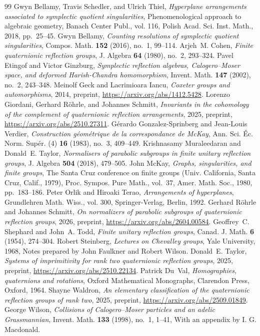 \documentclass[10pt,a4paper]{amsart}
\begin{document}
\begin{thebibliography}{99}
 Gwyn Bellamy, Travis Schedler, and Ulrich Thiel, \emph{Hyperplane arrangements associated to symplectic quotient singularities}, Phenomenological approach to algebraic geometry, Banach Center Publ., vol. 116, Polish Acad. Sci. Inst. Math., 2018, pp.~25--45.
 Gwyn Bellamy, \emph{Counting resolutions of symplectic quotient singularities}, Compos. Math. \textbf{152} (2016), no.~1, 99--114.
 Arjeh~M. Cohen, \emph{Finite quaternionic reflection groups}, J. Algebra \textbf{64} (1980), no.~2, 293--324.
 Pavel Etingof and Victor Ginzburg, \emph{Symplectic reflection algebras, {C}a\-lo\-ge\-ro--{M}oser space, and deformed {H}arish-{C}handra homomorphism}, Invent. Math. \textbf{147} (2002), no.~2, 243--348.
 Meinolf Geck and Lacrimioara Iancu, \emph{Coxeter groups and automorphisms}, 2014, preprint, \url{https://arxiv.org/abs/1412.5428}.
 Lorenzo Giordani, Gerhard Röhrle, and Johannes Schmitt, \emph{Invariants in the cohomology of the complement of quaternionic reflection arrangements}, 2025, preprint, \url{https://arxiv.org/abs/2510.27311}.
 Gérardo Gonzalez-Sprinberg and Jean-Louis Verdier, \emph{Con\-struc\-tion géo\-mé\-trique de la corres\-pon\-dance de {M}c{K}ay}, Ann. Sci. Éc. Norm. Supér. (4) \textbf{16} (1983), no.~3, 409--449.
 Krishnasamy Muraleedaran and Donald~E. Taylor, \emph{Normalisers of parabolic subgroups in finite unitary reflection groups}, J. Algebra \textbf{504} (2018), 479--505.
 John McKay, \emph{Graphs, singularities, and finite groups}, The {S}anta {C}ruz conference on finite groups ({U}niv. {C}alifornia, {S}anta {C}ruz, {C}alif., 1979), Proc. Sympos. Pure Math., vol.~37, Amer. Math. Soc., 1980, pp.~183--186.
 Peter Orlik and Hiroaki Terao, \emph{Arrangements of hyperplanes}, Grundlehren Math. Wiss., vol. 300, Springer-Verlag, Berlin, 1992.
 Gerhard Röhrle and Johannes Schmitt, \emph{On normalizers of parabolic subgroups of quaternionic reflection groups}, 2026, preprint, \url{https://arxiv.org/abs/2604.00584}.
 Geoffrey~C. Shephard and John~A. Todd, \emph{Finite unitary reflection groups}, Canad. J. Math. \textbf{6} (1954), 274--304.
 Robert Steinberg, \emph{Lectures on {C}hevalley groups}, Yale University, 1968, Notes prepared by John Faulkner and Robert Wilson.
 Donald~E. Taylor, \emph{Systems of imprimitivity for rank two quaternionic reflection groups}, 2025, preprint, \url{https://arxiv.org/abs/2510.22134}.
 Patrick Du~Val, \emph{Homographies, quaternions and rotations}, Oxford Mathematical Monographs, Clarendon Press, Oxford, 1964.
 Shayne Waldron, \emph{An elementary classification of the quaternionic reflection groups of rank two}, 2025, preprint, \url{https://arxiv.org/abs/2509.01849}.
 George Wilson, \emph{Collisions of {C}alogero--{M}oser particles and an adelic {G}rassmannian}, Invent. Math. \textbf{133} (1998), no.~1, 1--41, With an appendix by I. G. Macdonald.
\end{thebibliography}
\end{document}
